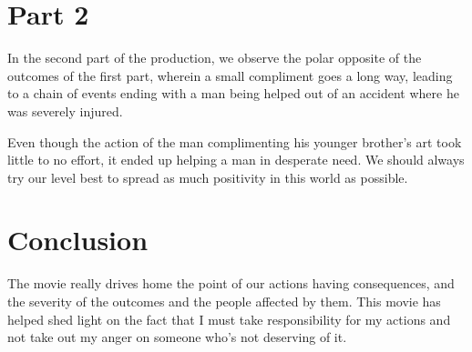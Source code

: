 \documentclass[a4paper, 12pt]{extarticle}
\begin{document}
 \section*{Part 2}
 
In the second part of the production, we observe the polar opposite of the outcomes of the first part, wherein a small compliment goes a long way, leading to a chain of events ending with a man being helped out of an accident where he was severely injured.

Even though the action of the man complimenting his younger brother's art took little to no effort, it ended up helping a man in desperate need. We should always try our level best to spread as much positivity in this world as possible.

\section*{Conclusion}

The movie really drives home the point of our actions having consequences, and the severity of the outcomes and the people affected by them. This movie has helped shed light on the fact that I must take responsibility for my actions and not take out my anger on someone who's not deserving of it.
\end{document}
